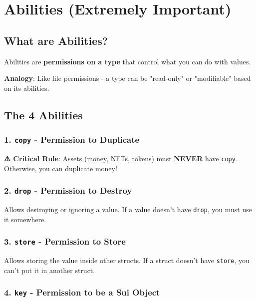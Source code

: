 \documentclass[11pt]{article}
\begin{document}
\section{Abilities (Extremely Important)}

\subsection{What are Abilities?}

Abilities are \textbf{permissions on a type} that control what you can do with values.

\begin{noteBox}
\textbf{Analogy}: Like file permissions - a type can be "read-only" or "modifiable" based on its abilities.
\end{noteBox}

\subsection{The 4 Abilities}

\subsubsection{1. \texttt{copy} - Permission to Duplicate}

\begin{warnBox}
\textbf{⚠️ Critical Rule}: Assets (money, NFTs, tokens) must \textbf{NEVER} have \texttt{copy}. Otherwise, you can duplicate money!
\end{warnBox}

\subsubsection{2. \texttt{drop} - Permission to Destroy}

Allows destroying or ignoring a value. If a value doesn't have \texttt{drop}, you must use it somewhere.

\subsubsection{3. \texttt{store} - Permission to Store}

Allows storing the value inside other structs. If a struct doesn't have \texttt{store}, you can't put it in another struct.

\subsubsection{4. \texttt{key} - Permission to be a Sui Object}
\end{document}
